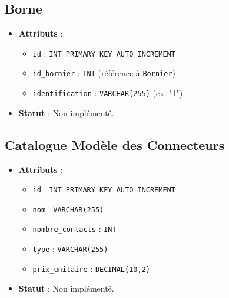 \documentclass[a4paper,12pt]{article}
\begin{document}
\subsection{Borne}
\begin{itemize}
    \item \textbf{Attributs} :
    \begin{itemize}
        \item \texttt{id} : \texttt{INT PRIMARY KEY AUTO\_INCREMENT}
        \item \texttt{id\_bornier} : \texttt{INT} (référence à \texttt{Bornier})
        \item \texttt{identification} : \texttt{VARCHAR(255)} (ex. "1")
    \end{itemize}
    \item \textbf{Statut} : Non implémenté.
\end{itemize}

\subsection{Catalogue Modèle des Connecteurs}
\begin{itemize}
    \item \textbf{Attributs} :
    \begin{itemize}
        \item \texttt{id} : \texttt{INT PRIMARY KEY AUTO\_INCREMENT}
        \item \texttt{nom} : \texttt{VARCHAR(255)}
        \item \texttt{nombre\_contacts} : \texttt{INT}
        \item \texttt{type} : \texttt{VARCHAR(255)}
        \item \texttt{prix\_unitaire} : \texttt{DECIMAL(10,2)}
    \end{itemize}
    \item \textbf{Statut} : Non implémenté.
\end{itemize}
\end{document}
